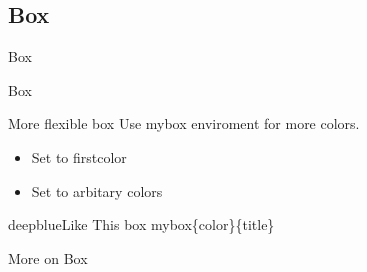 \documentclass[pdf]{beamer}
\begin{document}
\subsection{Box}

\begin{frame}{Box}


\end{frame}

\begin{frame}{Box}
    
\begin{mybox}{\firstcolor}{More flexible box}
Use mybox enviroment for more colors.
\begin{itemize}
    \item Set to firstcolor
    \item Set to arbitary colors
\end{itemize}
\end{mybox}

\begin{mybox}{deepblue}{Like This box}
mybox\{color\}\{title\}
\end{mybox}
    
\end{frame}

\begin{frame}{More on Box}

\begin{columns}[t]
    
    \begin{column}{0.5\linewidth}
    
        
        
    \end{column}
    
    \begin{column}{0.33\linewidth}
    
        
    \end{column}

\end{columns}

    
\end{frame}
\end{document}
